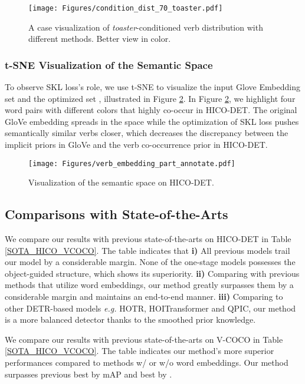 \documentclass[letterpaper]{article} \usepackage{aaai22}  \usepackage{times}  \usepackage{helvet}  \usepackage{courier}  \usepackage[hyphens]{url}  \usepackage{graphicx} \urlstyle{rm} \def\UrlFont{\rm}  \usepackage{natbib}  \usepackage{caption} \DeclareCaptionStyle{ruled}{labelfont=normalfont,labelsep=colon,strut=off} \frenchspacing  \setlength{\pdfpagewidth}{8.5in}  \setlength{\pdfpageheight}{11in}  \usepackage{algorithm}
\begin{document}
\begin{figure}[t]
\centering
\texttt{[image: Figures/condition\_dist\_70\_toaster.pdf]} 
\caption{A case visualization of \textit{toaster}-conditioned verb distribution with different methods. Better view in color.}
\label{verb_distribution}
\end{figure}


\subsubsection{t-SNE Visualization of the Semantic Space} To observe SKL loss's role, we use t-SNE \cite{maaten2008visualizingt-SNE} to visualize the input Glove Embedding set  and the optimized set , illustrated in Figure \ref{verb_embedding}. In Figure \ref{verb_embedding}, we highlight four word pairs with different colors that highly co-occur in HICO-DET. The original GloVe embedding spreads in the space while the optimization of SKL loss pushes semantically similar verbs closer, which decreases the discrepancy between the implicit priors in GloVe and the verb co-occurrence prior in HICO-DET.


\begin{figure}[t]
\centering
\texttt{[image: Figures/verb\_embedding\_part\_annotate.pdf]} 
\caption{Visualization of the semantic space on HICO-DET.}
\label{verb_embedding}
\end{figure}









\subsection{Comparisons with State-of-the-Arts} We compare our results with previous state-of-the-arts on HICO-DET in Table \ref{SOTA_HICO_VCOCO}. The table indicates that \textbf{i)} All previous models trail our model by a considerable margin. None of the one-stage models possesses the object-guided structure, which shows its superiority. \textbf{ii)} Comparing with previous methods that utilize word embeddings, our method greatly surpasses them by a considerable margin and maintains an end-to-end manner. \textbf{iii)} Comparing to other DETR-based models \textit{e.g.} HOTR, HOITransformer and QPIC, our method is a more balanced detector thanks to the smoothed prior knowledge.


We compare our results with previous state-of-the-arts on V-COCO in Table \ref{SOTA_HICO_VCOCO}. The table indicates our method's more superior performances compared to methods w/ or w/o word embeddings. Our method surpasses previous best  by  mAP and best  by . 
\end{document}
